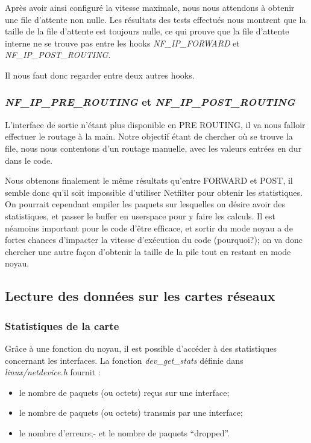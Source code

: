 \documentclass[a4paper]{article}
\begin{document}
Après avoir ainsi configuré la vitesse maximale,
nous nous attendons à obtenir une file d’attente non nulle.
Les résultats des tests effectués nous montrent que la taille
de la file d’attente est toujours nulle, ce qui prouve que la
file d’attente interne ne se trouve pas entre les hooks
\textit{NF\_IP\_FORWARD} et \textit{NF\_IP\_POST\_ROUTING}.

Il nous faut donc regarder entre deux autres hooks.

\subsubsection{\textit{NF\_IP\_PRE\_ROUTING} et \textit{NF\_IP\_POST\_ROUTING}}
L'interface de sortie n'étant plus disponible en PRE ROUTING,
il va nous falloir effectuer le routage à la main. Notre
objectif étant de chercher où se trouve la file, nous nous
contentons d'un routage manuelle, avec les valeurs entrées en
dur dans le code.

Nous obtenons finalement le même résultats qu'entre FORWARD et POST,
il semble donc qu'il soit impossible d'utiliser Netfilter pour
obtenir les statistiques. On pourrait cependant empiler les paquets
sur lesquelles on désire avoir des statistiques, et passer le
buffer en userspace pour y faire les calculs. Il est néamoins
important pour le code d'être efficace, et sortir du mode noyau
a de fortes chances d'impacter la vitesse d'exécution du code
(pourquoi?); on va donc chercher une autre façon d'obtenir
la taille de la pile tout en restant en mode noyau.

\subsection{Lecture des données sur les cartes réseaux}
\subsubsection{Statistiques de la carte}
Grâce à une fonction du noyau, il est possible d’accéder à des
statistiques concernant les interfaces. La fonction \textit{dev\_get\_stats}
définie dans \textit{linux/netdevice.h} fournit :
\begin{itemize}
	\item le nombre de paquets (ou octets) reçus sur une interface;
	\item le nombre de paquets (ou octets) transmis par une interface;
	\item le nombre d’erreurs;- et le nombre de paquets “dropped”.
\end{itemize}
\end{document}
